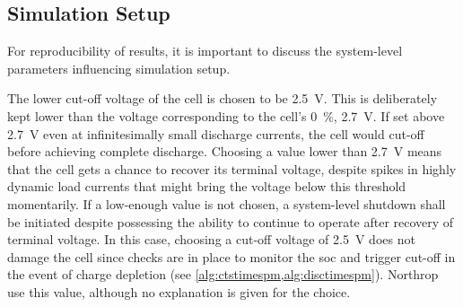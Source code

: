 \subsection{Simulation Setup}\label{subsec:basicspmsimsetup}

For  reproducibility of  results, it  is important  to discuss  the system-level
parameters influencing simulation setup.

The lower  cut-off voltage  of the  cell is chosen  to be  \SI{2.5}{\volt}. This
is  deliberately  kept  lower  than  the voltage  corresponding  to  the  cell's
\SI{0}{\percent},  \ie{}  \SI{2.7}{\volt}.  If set  above  \SI{2.7}{\volt}  even
at  infinitesimally small  discharge  currents, the  cell  would cut-off  before
achieving complete discharge. Choosing a value lower than \SI{2.7}{V} means that
the cell gets a chance to recover its terminal voltage, despite spikes in highly
dynamic  load  currents  that  might  bring the  voltage  below  this  threshold
momentarily. If a low-enough value is  not chosen, a system-level shutdown shall
be  initiated  despite possessing  the  ability  to  continue to  operate  after
recovery  of terminal  voltage.  In this  case, choosing  a  cut-off voltage  of
\SI{2.5}{\volt}  does  not  damage  the  cell  since  checks  are  in  place  to
monitor  the \gls{soc}  and trigger  cut-off in  the event  of charge  depletion
(see \cref{alg:ctstimespm,alg:disctimespm}).  Northrop~\etal~\cite{Northrop2011}
use this value, although no explanation is given for the choice.


